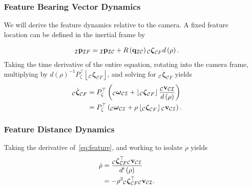 \documentclass{beamer}
\begin{document}
\begin{frame}
\frametitle{Feature Bearing Vector Dynamics}
We will derive the feature dynamics relative to the camera. A fixed
feature location can be defined in the inertial frame by

\begin{equation}
_{\mathcal{I}}{\bf p}_{\mathcal{I}F}={}_{\mathcal{I}}{\bf p}_{\mathcal{I}\mathcal{C}}+R\left({\bf q}_{\mathcal{I}\mathcal{C}}\right){}_{\mathcal{C}}\boldsymbol{\zeta}_{\mathcal{C}F}d\left(\rho\right).\label{eq:feature}
\end{equation}
Taking the time derivative of the entire equation, rotating into the camera frame, multiplying by $d\left(\rho\right)^{-1}P_{\zeta}^{\top}\left\lfloor _{\mathcal{C}}\boldsymbol{\zeta}_{\mathcal{C}F}\right\rfloor $, and solving for $_{\mathcal{C}}\dot{\boldsymbol{\zeta}}_{\mathcal{C}F}$  yields
\begin{align}
_{\mathcal{C}}\dot{\boldsymbol{\zeta}}_{\mathcal{C}F} & =P_{\zeta}^{\top}\left(_{\mathcal{C}}\boldsymbol{\omega}_{\mathcal{C}\mathcal{I}}+\left\lfloor _{\mathcal{C}}\boldsymbol{\zeta}_{\mathcal{C}F}\right\rfloor \frac{_{\mathcal{C}}{\bf v}_{\mathcal{C}\mathcal{I}}}{d\left(\rho\right)}\right)\\
 & =P_{\zeta}^{\top}\left(_{\mathcal{C}}\boldsymbol{\omega}_{\mathcal{C}\mathcal{I}}+\rho\left\lfloor _{\mathcal{C}}\boldsymbol{\zeta}_{\mathcal{C}F}\right\rfloor {}_{\mathcal{C}}{\bf v}_{\mathcal{C}\mathcal{I}}\right).
\end{align}
\end{frame}


\begin{frame}
\frametitle{Feature Distance Dynamics}
Taking the derivative of~\ref{eq:feature}, and working to isolate $\dot{\rho}$ yields
\begin{align}
\dot{\rho} & =\dfrac{_{\mathcal{C}}\boldsymbol{\zeta}_{\mathcal{C}F}^{\top}{}_{\mathcal{C}}{\bf v}_{\mathcal{C}\mathcal{I}}}{d^{\prime}\left(\rho\right)}\\
 & =-\rho^{2}{}_{\mathcal{C}}\boldsymbol{\zeta}_{\mathcal{C}F}^{\top}{}_{\mathcal{C}}{\bf v}_{\mathcal{C}\mathcal{I}}.
\end{align}
\end{frame}
\end{document}
